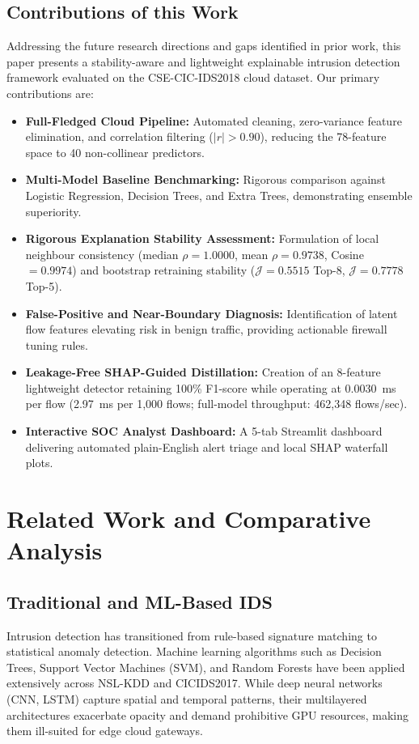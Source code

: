 \documentclass[conference]{IEEEtran}
\begin{document}
\subsection{Contributions of this Work}
Addressing the future research directions and gaps identified in prior work, this paper presents a stability-aware and lightweight explainable intrusion detection framework evaluated on the CSE-CIC-IDS2018 cloud dataset. Our primary contributions are:
\begin{itemize}
    \item \textbf{Full-Fledged Cloud Pipeline:} Automated cleaning, zero-variance feature elimination, and correlation filtering ($|r| > 0.90$), reducing the 78-feature space to 40 non-collinear predictors.
    \item \textbf{Multi-Model Baseline Benchmarking:} Rigorous comparison against Logistic Regression, Decision Trees, and Extra Trees, demonstrating ensemble superiority.
    \item \textbf{Rigorous Explanation Stability Assessment:} Formulation of local neighbour consistency (median $\rho = 1.0000$, mean $\rho = 0.9738$, Cosine $= 0.9974$) and bootstrap retraining stability ($\mathcal{J} = 0.5515$ Top-8, $\mathcal{J} = 0.7778$ Top-5).
    \item \textbf{False-Positive and Near-Boundary Diagnosis:} Identification of latent flow features elevating risk in benign traffic, providing actionable firewall tuning rules.
    \item \textbf{Leakage-Free SHAP-Guided Distillation:} Creation of an 8-feature lightweight detector retaining 100\% F1-score while operating at 0.0030~ms per flow (2.97~ms per 1,000 flows; full-model throughput: 462,348 flows/sec).
    \item \textbf{Interactive SOC Analyst Dashboard:} A 5-tab Streamlit dashboard delivering automated plain-English alert triage and local SHAP waterfall plots.
\end{itemize}

\section{Related Work and Comparative Analysis}

\subsection{Traditional and ML-Based IDS}
Intrusion detection has transitioned from rule-based signature matching to statistical anomaly detection\cite{lee2023framework}. Machine learning algorithms such as Decision Trees, Support Vector Machines (SVM), and Random Forests have been applied extensively across NSL-KDD and CICIDS2017\cite{zhang2024shap}. While deep neural networks (CNN, LSTM) capture spatial and temporal patterns, their multilayered architectures exacerbate opacity and demand prohibitive GPU resources, making them ill-suited for edge cloud gateways\cite{alazab2025deep}.
\end{document}
